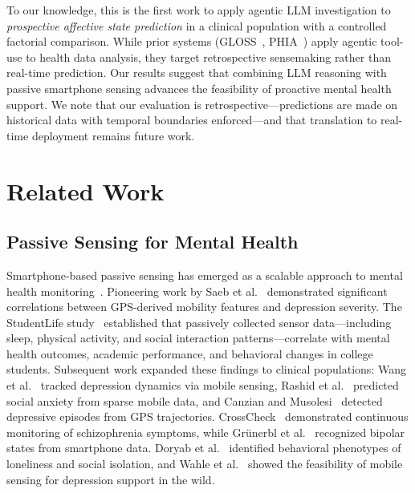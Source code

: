 \documentclass[screen,review,anonymous]{acmart}
\begin{document}
\noindent To our knowledge, this is the first work to apply agentic LLM investigation to \emph{prospective affective state prediction} in a clinical population with a controlled factorial comparison. While prior systems (GLOSS~\cite{min2025gloss}, PHIA~\cite{merrill2025phia}) apply agentic tool-use to health data analysis, they target retrospective sensemaking rather than real-time prediction. Our results suggest that combining LLM reasoning with passive smartphone sensing advances the feasibility of proactive mental health support. We note that our evaluation is retrospective---predictions are made on historical data with temporal boundaries enforced---and that translation to real-time deployment remains future work.

\section{Related Work}

\subsection{Passive Sensing for Mental Health}

Smartphone-based passive sensing has emerged as a scalable approach to mental health monitoring~\cite{torous2016smartphone_psychiatry, jacobson2019digital_phenotyping}. Pioneering work by Saeb et al.~\cite{saeb2015phenotyping} demonstrated significant correlations between GPS-derived mobility features and depression severity. The StudentLife study~\cite{wang2014studentlife} established that passively collected sensor data---including sleep, physical activity, and social interaction patterns---correlate with mental health outcomes, academic performance, and behavioral changes in college students. Subsequent work expanded these findings to clinical populations: Wang et al.~\cite{wang2018sensing} tracked depression dynamics via mobile sensing, Rashid et al.~\cite{rashid2020predicting} predicted social anxiety from sparse mobile data, and Canzian and Musolesi~\cite{canzian2015trajectories} detected depressive episodes from GPS trajectories. CrossCheck~\cite{ben_zeev2015crosscheck} demonstrated continuous monitoring of schizophrenia symptoms, while Gr{\"u}nerbl et al.~\cite{gruenerbl2015phone_depression} recognized bipolar states from smartphone data. Doryab et al.~\cite{doryab2019modeling_behavior} identified behavioral phenotypes of loneliness and social isolation, and Wahle et al.~\cite{wahle2016mobile_sensing} showed the feasibility of mobile sensing for depression support in the wild.
\end{document}

